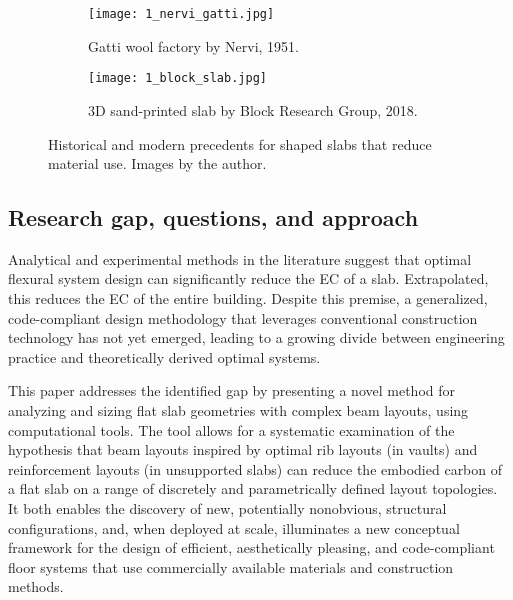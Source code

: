 \documentclass[10pt, letterpaper]{article} %
\begin{document}
    \begin{figure}[ht]
        \centering
        \begin{subfigure}[c]{0.4\textwidth}
            \centering
            \texttt{[image: 1\_nervi\_gatti.jpg]} 
            \caption{Gatti wool factory by Nervi, 1951. \cite{nerviAestheticsTechnologyBuilding1965}}
            \label{fig:subfigure1}
        \end{subfigure}
        \hfill
        \begin{subfigure}[c]{0.53\textwidth}
            \centering
            \texttt{[image: 1\_block\_slab.jpg]} 
            \caption{3D sand-printed slab by Block Research Group, 2018. \cite{rippmannDesignFabricationTesting2018}}
            \label{fig:subfigure2}
        \end{subfigure}
        \caption{Historical and modern precedents for shaped slabs that reduce material use. Images by the author.}
        \label{fig:nervi-block}
    \end{figure}

    \subsection{Research gap, questions, and approach}

    Analytical and experimental methods in the literature suggest that optimal flexural system design can significantly reduce the EC of a slab. Extrapolated, this reduces the EC of the entire building. Despite this premise, a generalized, code-compliant design methodology that leverages conventional construction technology has not yet emerged, leading to a growing divide between engineering practice and theoretically derived optimal systems.

    This paper addresses the identified gap by presenting a novel method for analyzing and sizing flat slab geometries with complex beam layouts, using computational tools. The tool allows for a systematic examination of the hypothesis that beam layouts inspired by optimal rib layouts (in vaults) and reinforcement layouts (in unsupported slabs) can reduce the embodied carbon of a flat slab on a range of discretely and parametrically defined layout topologies. It both enables the discovery of new, potentially nonobvious, structural configurations, and, when deployed at scale, illuminates a new conceptual framework for the design of efficient, aesthetically pleasing, and code-compliant floor systems that use commercially available materials and construction methods. 
\end{document}
